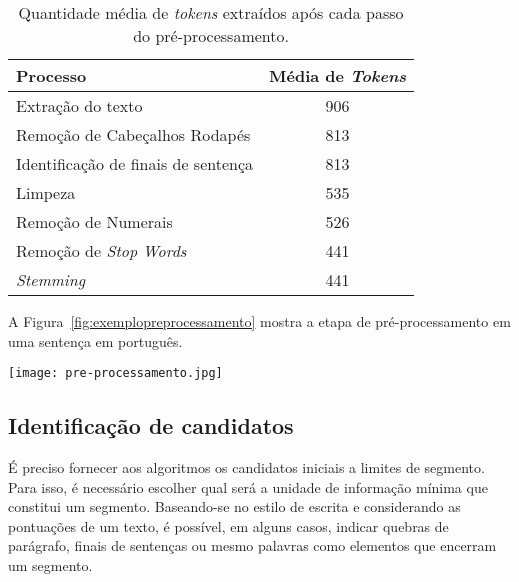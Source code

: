 \begin{table}[!h]
	\centering

	\begin{tabular}{|l|c|}
	
		\hline
		\textbf{Processo}      &  \textbf{Média de \textit{Tokens}}\\		

		\hline

		Extração do texto                    & 906 \\ \hline
		Remoção de Cabeçalhos Rodapés        & 813 \\ \hline
		Identificação de finais de sentença  & 813 \\ \hline
		Limpeza                              & 535 \\ \hline
		Remoção de Numerais                  & 526 \\ \hline
		Remoção de \textit{Stop Words}       & 441 \\ \hline
		\textit{Stemming}                    & 441 \\ \hline
		
		
	\end{tabular}
	
	\caption{Quantidade média de \textit{tokens} extraídos após cada passo do pré-processamento.}
	\label{tab:preprocessamento}
\end{table}


A Figura~\ref{fig:exemplopreprocessamento} mostra a etapa de pré-processamento em uma sentença em português.
	


  \begin{figure*}
	\centering
	\texttt{[image: pre-processamento.jpg]}
	\caption{Exemplo de pré-processamento.}
	\label{fig:exemplopreprocessamento}
  \end{figure*}






\subsection{Identificação de candidatos}
	\label{subsec:indentificacaosentencas}
	
	
	
	É preciso fornecer aos algoritmos os candidatos iniciais a limites de segmento. Para isso, é necessário escolher qual será a unidade de informação mínima que constitui um segmento. Baseando-se no estilo de escrita e considerando as pontuações de um texto, é possível, em alguns casos, indicar quebras de parágrafo, finais de sentenças ou mesmo palavras como elementos que encerram um segmento. 

